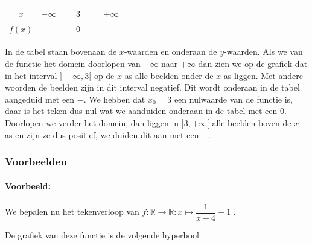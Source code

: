 \documentclass[12pt,twoside]{article}
\begin{document}
\begin{theorie}
\begin{center}
  \begin{tabular}{c|lcccr}
    $x$ & $-\infty$ & & $3$ & & $+\infty$\\
    \hline
    $f(x)$ & & - & 0 & + &
  \end{tabular}
\end{center}

In de tabel staan bovenaan de $x$-waarden en onderaan de $y$-waarden. Als we van de functie het domein doorlopen van $-\infty$ naar $+\infty$ dan zien we op de grafiek dat in het interval $]-\infty,3[$ op de $x$-as alle beelden onder de $x$-as liggen. Met andere woorden de beelden zijn in dit interval negatief. Dit wordt onderaan in de tabel aangeduid met een $-$. We hebben dat $x_0=3$ een nulwaarde van de functie is, daar is het teken dus nul wat we aanduiden onderaan in de tabel met een $0$. Doorlopen we verder het domein, dan liggen in $]3,+\infty[$ alle beelden boven de $x$-as en zijn ze dus positief, we duiden dit aan met een $+$.

\subsubsection*{Voorbeelden}

\paragraph{Voorbeeld:} We bepalen nu het tekenverloop van $f:\mathbb{R}\to\mathbb{R}:x\mapsto \dfrac{1}{x-4}+1\;.$

De grafiek van deze functie is de volgende hyperbool
\begin{center}
\end{center}


\end{theorie}
\end{document}
